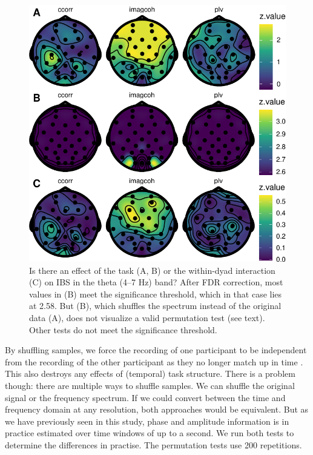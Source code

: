 \begin{figure}[!htpb]
  \includegraphics[width=\linewidth]{../stats/results/permutation_theta.pdf}
  \caption{Is there an effect of the task (A, B) or the within-dyad interaction (C) on IBS in the theta (4--7 Hz) band? After FDR correction, most values in (B) meet the significance threshold, which in that case lies at 2.58. But (B), which shuffles the spectrum instead of the original data (A), does not visualize a valid permutation test (see text). Other tests do not meet the significance threshold.}
  \label{fig:permutation_theta}
\end{figure}

By shuffling samples, we force the recording of one participant to be
independent from the recording of the other participant as they no longer match
up in time \parencite{lachaux_measuring_1999}. This also destroys any effects of
(temporal) task structure. There is a problem though: there are multiple ways to
shuffle samples. We can shuffle the original signal or the frequency spectrum.
If we could convert between the time and frequency domain at any resolution,
both approaches would be equivalent. But as we have previously seen in this
study, phase and amplitude information is in practice estimated over time
windows of up to a second. We run both tests to determine the differences in
practise. The permutation tests use 200 repetitions.


